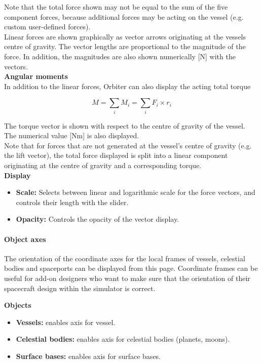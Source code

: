 \documentclass[Orbiter User Manual.tex]{subfiles}
\begin{document}
\noindent
Note that the total force shown may not be equal to the sum of the five component forces, because additional forces may be acting on the vessel (e.g. custom user-defined forces).\\
Linear forces are shown graphically as vector arrows originating at the vessels centre of gravity. The vector lengths are proportional to the magnitude of the force. In addition, the magnitudes are also shown numerically [N] with the vectors.\\

\noindent
\textbf{Angular moments}\\
In addition to the linear forces, Orbiter can also display the acting total torque

\[ M = \sum_{i} M_{i}= \sum_{i} F_{i} \times r_{i} \]

\noindent
The torque vector is shown with respect to the centre of gravity of the vessel. The numerical value [Nm] is also displayed.\\
Note that for forces that are not generated at the vessel's centre of gravity (e.g. the lift vector), the total force displayed is split into a linear component originating at the centre of gravity and a corresponding torque.\\

\noindent
\textbf{Display}\\
\begin{itemize}
\item \textbf{Scale:} Selects between linear and logarithmic scale for the force vectors, and controls their length with the slider.
\item \textbf{Opacity:} Controls the opacity of the vector display.
\end{itemize}


\paragraph{Object axes}
The orientation of the coordinate axes for the local frames of vessels, celestial bodies and spaceports can be displayed from this page. Coordinate frames can be useful for add-on designers who want to make sure that the orientation of their spacecraft design within the simulator is correct.

\begin{figure}[H]
	\centering
\end{figure}

\noindent
\textbf{Objects}
\begin{itemize}
\item \textbf{Vessels:} enables axis for vessel.
\item \textbf{Celestial bodies:} enables axis for celestial bodies (planets, moons).
\item \textbf{Surface bases:} enables axis for surface bases.
\end{itemize}
\end{document}
